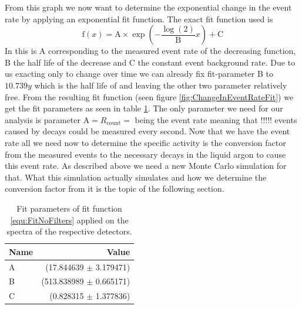 From this graph we now want to determine the exponential change in the event rate by applying an exponential fit function.
The exact fit function used is
\begin{equation}
\mathrm{f}(x) = \mathrm{A}\times\exp\left(-\frac{\log(2)}{\mathrm{B}} x \right) + \mathrm{C}
\label{equ:FitFilters}
\end{equation}
In this is A corresponding to the measured \Kr event rate of the decreasing function, B the half life of the decrease and C the constant event background rate.
Due to us exacting only \Kr to change over time we can already fix fit-parameter B to \(10.739\unit{y}\) which is the half life of \Kr and leaving the other two parameter relatively free.
From the resulting fit function (seen figure \ref{fig:ChangeInEventRateFit}) we get the fit parameters as seen in table \ref{tab:FitParZeit}.
The only parameter we need for our analysis is parameter \(\mathrm{A} = R_{\mathrm{count}} = \) being the \Kr event rate meaning that !!!!! events caused by \Kr decays could be measured every second.
Now that we have the \Kr event rate all we need now to determine the specific activity is the conversion factor from the measured events to the necessary \Kr decays in the liquid argon to cause this \Kr event rate.
As described above we need a new Monte Carlo simulation for that.
What this simulation actually simulates and how we determine the conversion factor from it is the topic of the following section.


\begin{table}[t!]
	\centering
	\begin{tabular}{|l|r|}
		\hline
		Name	& Value  \\ 
		\hline
		A  &	(17.844639 \(\pm\)	3.179471)\\	
		\hline
		B  &	(513.838989 \(\pm\)	0.665171)\\	
		\hline
		C  &	(0.828315 \(\pm\)	1.377836)\\
		\hline
	\end{tabular}
	\caption{Fit parameters of fit function \ref{equ:FitNoFilters} applied on the spectra of the respective detectors.}
    \label{tab:FitParZeit}
\end{table}

